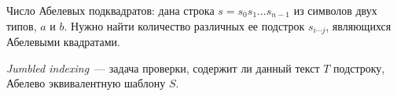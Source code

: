 \begin{problem}
Число Абелевых подквадратов: дана строка $s=s_0s_1 \ldots s_{n-1}$ из символов двух типов, $a$ и $b$. Нужно найти количество различных ее подстрок $s_{i \cdots j}$, являющихся Абелевыми квадратами.
\end{problem}

\begin{problem}
\textit{Jumbled indexing}~--- задача проверки, содержит ли данный текст $T$ подстроку, Абелево эквивалентную шаблону $S$.
\end{problem}





